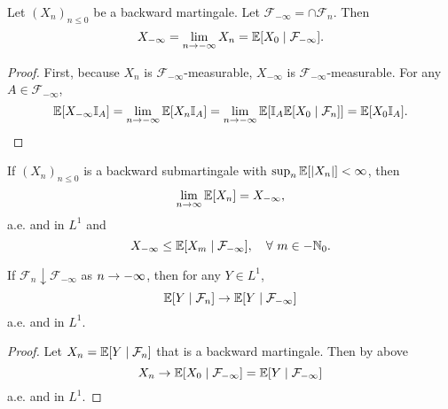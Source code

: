 \begin{thm}
    Let $(X_n)_{n \leq 0}$ be a backward martingale. Let $\mathcal{F}_{-\infty} = \cap \mathcal{F}_n$. Then
    \begin{equation*}
        X_{-\infty} = \lim_{n \rightarrow -\infty}X_n = \mathbb{E}[X_0 \mid \mathcal{F}_{-\infty}].
    \end{equation*}
\end{thm}
\begin{proof}
    First, because $X_n$ is $\mathcal{F}_{-\infty}$-measurable, $X_{-\infty}$ is $\mathcal{F}_{-\infty}$-measurable. For any $A \in \mathcal{F}_{-\infty}$, 
    \begin{equation*}
        \mathbb{E}[X_{-\infty}\mathbb{I}_A] = \lim_{n\rightarrow -\infty} \mathbb{E}[X_n\mathbb{I}_A] = \lim_{n\rightarrow -\infty} \mathbb{E}[\mathbb{I}_A\mathbb{E}[X_0 \mid \mathcal{F}_n]] = \mathbb{E}[X_0\mathbb{I}_A].\qedhere
    \end{equation*}
\end{proof}
\begin{rmk}
    If $(X_n)_{n \leq 0}$ is a backward submartingale with $\sup_n \mathbb{E}[\left\lvert X_n\right\lvert] < \infty$, then
    \begin{equation*}
        \lim_{n \rightarrow \infty}\mathbb{E}[X_n] = X_{-\infty},
    \end{equation*}
    a.e. and in $L^1$ and
    \begin{equation*}
        X_{-\infty} \leq \mathbb{E}[X_m \mid \mathcal{F}_{-\infty}],\quad \forall~m \in -\mathbb{N}_0.
    \end{equation*}
\end{rmk}



\begin{thm}
    If $\mathcal{F}_n \downarrow \mathcal{F}_{-\infty}$ as $n \rightarrow -\infty$, then for any $Y \in L^1$,
    \begin{equation*}
        \mathbb{E}[Y \mid \mathcal{F}_n] \rightarrow \mathbb{E}[Y \mid \mathcal{F}_{-\infty}]
    \end{equation*}
    a.e. and in $L^1$.
\end{thm}
\begin{proof}
    Let $X_n = \mathbb{E}[Y \mid \mathcal{F}_n]$ that is a backward martingale. Then by above
    \begin{equation*}
        X_n \rightarrow \mathbb{E}[X_0 \mid \mathcal{F}_{-\infty}] = \mathbb{E}[Y \mid \mathcal{F}_{-\infty}]
    \end{equation*}
    a.e. and in $L^1$.
\end{proof}

